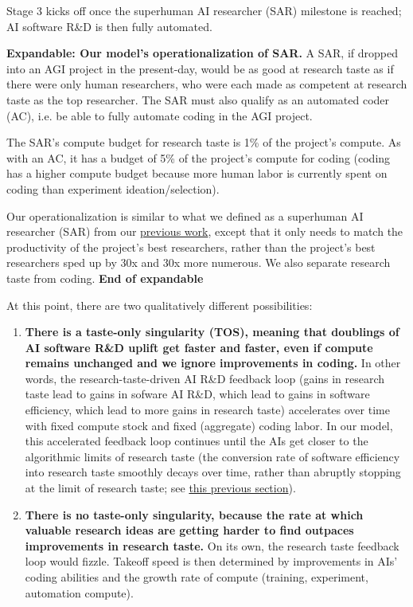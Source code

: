 \documentclass{article}
\theoremstyle{definition}
\begin{document}
Stage 3 kicks off once the superhuman AI researcher (SAR) milestone is reached; AI software R\&D is then fully automated.

\textbf{Expandable: Our model's operationalization of SAR.} A SAR, if dropped into an AGI project in the present-day, would be as good at research taste as if there were only human researchers, who were each made as competent at research taste as the top researcher. The SAR must also qualify as an automated coder (AC), i.e. be able to fully automate coding in the AGI project.

The SAR’s compute budget for research taste is 1\% of the project’s compute. As with an AC, it has a budget of 5\% of the project’s compute for coding (coding has a higher compute budget because more human labor is currently spent on coding than experiment ideation/selection).

Our operationalization is similar to what we defined as a superhuman AI researcher (SAR) from our \href{https://ai-2027.com/research/takeoff-forecast}{previous work}, except that it only needs to match the productivity of the project’s best researchers, rather than the project’s best researchers sped up by 30x and 30x more numerous. We also separate research taste from coding. \textbf{End of expandable}

At this point, there are two qualitatively different possibilities:
\begin{enumerate}
\item \textbf{There is a taste-only singularity (TOS), meaning that doublings of AI software R\&D uplift get faster and faster, even if compute remains unchanged and we ignore improvements in coding.} In other words, the research-taste-driven AI R\&D feedback loop (gains in research taste lead to gains in sofware AI R\&D, which lead to gains in software efficiency, which lead to more gains in research taste) accelerates over time with fixed compute stock and fixed (aggregate) coding labor. In our model, this accelerated feedback loop continues until the AIs get closer to the algorithmic limits of research taste (the conversion rate of software efficiency into research taste smoothly decays over time, rather than abruptly stopping at the limit of research taste; see \hyperref[Algorithmic limits]{this previous section}).
\item \textbf{There is no taste-only singularity, because the rate at which valuable research ideas are getting harder to find outpaces improvements in research taste.} On its own, the research taste feedback loop would fizzle. Takeoff speed
is then determined by improvements in AIs' coding abilities and the growth rate of compute (training, experiment, automation compute).
\end{enumerate}
\end{document}
